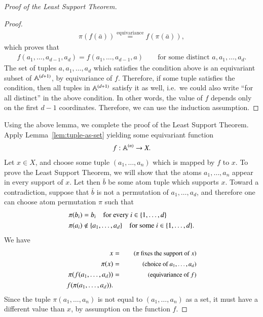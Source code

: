\begin{proof}[Proof of the Least Support Theorem]
\begin{proof}
\begin{eqnarray*}
 \pi(f(\bar a)) \stackrel{\text{equivariance}} =
 f(\pi(\bar a)),
 \end{eqnarray*}
which proves that 
 \begin{align*}
 f(a_1,\ldots,a_{d-1},a_d) = f(a_1,\ldots,a_{d-1},a) \qquad \text{for some distinct $a,a_1,\ldots,a_d$.}
 \end{align*}
 The set of tuples $a,a_1,\ldots,a_d$ which satisfies the condition above is an equivariant subset of $\mathbb A^{(d+1)}$, by equivariance of $f$. Therefore, if some tuple satisfies the condition, then all tuples in $\mathbb A^{(d+1)}$ satisfy it as well, i.e.~we could also write ``for all distinct'' in the above condition.
 In other words, the value of $f$ depends only on the first $d-1$ coordinates. Therefore, we can use the induction assumption. 
\end{proof}

Using the above lemma, we complete the proof of the  Least Support Theorem.  Apply Lemma~\ref{lem:tuple-as-set}
yielding some equivariant function
\begin{align*}
 f : \mathbb A^{(n)} \to X.
\end{align*}
Let $x \in X$, and choose  some tuple $(a_1,\ldots,a_n)$ which is mapped by $f$ to $x$. To prove the Least Support Theorem, we will show that the atoms $a_1,\ldots,a_n$ appear in every support of $x$. Let then $\bar b$ be some atom tuple which supports $x$. Toward a contradiction, suppose that $\bar b$ is not a permutation of $a_1,\ldots,a_d$, and therefore one can choose atom permutation $\pi$ such that 
\begin{align*}
\pi(b_i) & = b_i \quad \text{for every $i \in \{1,\ldots,d\}$}\\
\pi(a_i) & \not \in \{a_1,\ldots,a_d\} \quad \text{for some $i \in \{1,\ldots,d\}$.}
\end{align*}
We have 
\begin{eqnarray*}
 x &=\quad & \text{\small($\pi$ fixes the support of $x$)}\\ 
 \pi(x) &=\quad & \text{\small(choice of $a_1,\ldots,a_d$)}\\ 
 \pi(f(a_1,\ldots,a_d)) &=\quad & \text{\small(equivariance of $f$)}\\
 f(\pi(a_1,\ldots,a_d)).
\end{eqnarray*}
Since the tuple $\pi(a_1,\ldots,a_n)$ is not equal to $(a_1,\ldots,a_n)$ as a set, it must have a different value than $x$, by assumption on the function $f$. 
\end{proof}



